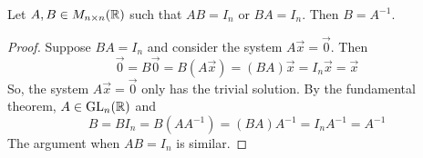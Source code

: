 \documentclass[12pt]{article}
\begin{document}
\newpage
\begin{thm}
  Let $A, B\in M_{n\times n}(\mathbb{R})$ such that $AB=I_n$ or $BA=I_n$. Then
  $B=A^{-1}$.
\end{thm}
\begin{proof}
  Suppose $BA=I_n$ and consider the system $A\vec x=\vec 0$. Then
  \[
  \vec 0= B\vec 0= B(A\vec x)= (BA)\vec x= I_n\vec x= \vec x
  \]
  So, the system $A\vec x=\vec 0$ only has the trivial solution. By the
  fundamental theorem, $A\in\operatorname{GL}_n(\mathbb{R})$ and 
  \[
  B = BI_n = B(AA^{-1}) = (BA)A^{-1} = I_nA^{-1} = A^{-1}
  \]
  The argument when $AB=I_n$ is similar.
\end{proof}


{}

\end{document}
